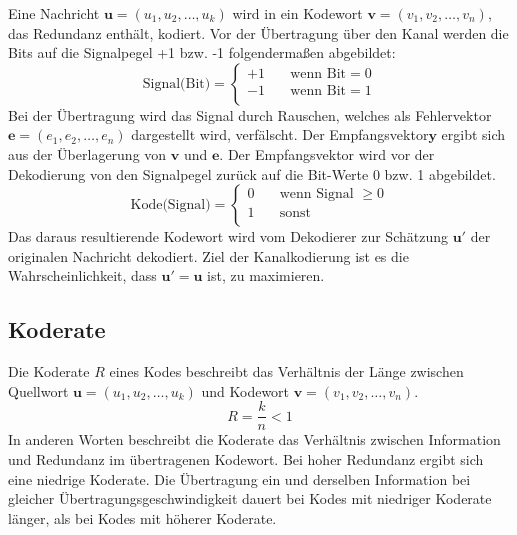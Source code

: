 Eine Nachricht $\mathbf{u}=\left( u_{1},u_{2},\dots ,u_{k}\right)$ wird in ein Kodewort $\mathbf{v}=\left( v_{1},v_{2},\dots ,v_{n}\right)$, das Redundanz enthält, kodiert. Vor der Übertragung über den Kanal werden die Bits auf die Signalpegel +1 bzw. -1 folgendermaßen abgebildet:
\begin{equation}
\text{Signal(Bit)} =
\begin{cases}
  +1  & \quad \text{wenn Bit} = 0\\
  -1  & \quad \text{wenn Bit} = 1\\
\end{cases}
\label{eq:bit_zu_signal_abbildung}
\end{equation}
Bei der Übertragung wird das Signal durch Rauschen, welches als Fehlervektor $\mathbf{e}=\left( e_{1},e_{2},\dots ,e_{n}\right)$ dargestellt wird, verfälscht. Der Empfangsvektor$\mathbf{y}$ ergibt sich aus der Überlagerung von $\mathbf{v}$ und $\mathbf{e}$. Der Empfangsvektor wird vor der Dekodierung von den Signalpegel zurück auf die Bit-Werte 0 bzw. 1 abgebildet.
\begin{equation}
\text{Kode(Signal)} =
\begin{cases}
  0  & \quad \text{wenn Signal } \geq 0\\
  1  & \quad \text{sonst}\\
\end{cases}
\label{eq:signal_zu_bit_abbildung}
\end{equation}
Das daraus resultierende Kodewort wird vom Dekodierer zur Schätzung $\mathbf{u'}$ der originalen Nachricht dekodiert. Ziel der Kanalkodierung ist es die Wahrscheinlichkeit, dass $\mathbf{u'}=\mathbf{u}$ ist, zu maximieren.

\subsection{Koderate}
\label{kapitel:grundlagen_koderate}
Die Koderate $R$ eines Kodes beschreibt das Verhältnis der Länge zwischen Quellwort $\mathbf{u}=\left( u_{1},u_{2},\dots ,u_{k}\right)$ und Kodewort $\mathbf{v}=\left( v_{1},v_{2},\dots ,v_{n}\right)$.
\begin{equation}
R=\frac{k}{n}<1
\end{equation}
In anderen Worten beschreibt die Koderate das Verhältnis zwischen Information und Redundanz im übertragenen Kodewort. Bei hoher Redundanz ergibt sich eine niedrige Koderate. Die Übertragung ein und derselben Information bei gleicher Übertragungsgeschwindigkeit dauert bei Kodes mit niedriger Koderate länger, als bei Kodes mit höherer Koderate.

